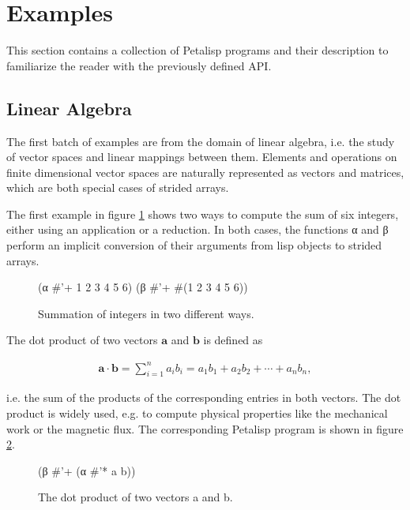 \section{Examples}
\label{sec:examples}

This section contains a collection of Petalisp programs and their
description to familiarize the reader with the previously defined
API.

\subsection{Linear Algebra}

The first batch of examples are from the domain of linear algebra, i.e. the
study of vector spaces and linear mappings between them. Elements and
operations on finite dimensional vector spaces are naturally represented as
vectors and matrices, which are both special cases of strided arrays.

The first example in figure \ref{fig:summation} shows two ways to compute
the sum of six integers, either using an application or a reduction. In
both cases, the functions α and β perform an implicit conversion of their
arguments from lisp objects to strided arrays.

\begin{figure}[h]
\resetlinenumber
\begin{code}
(α #'+ 1 2 3 4 5 6)
(β #'+ #(1 2 3 4 5 6))
\end{code}
\caption{Summation of integers in two different ways.}
\label{fig:summation}
\end{figure}

The dot product of two vectors $\mathbf{a}$ and $\mathbf{b}$ is defined as

\begin{align}
{ \mathbf {a} \cdot \mathbf {b} =\sum _{i=1}^{n}a_{i}b_{i}=a_{1}b_{1}+a_{2}b_{2}+\cdots +a_{n}b_{n}},
\end{align}

i.e. the sum of the products of the corresponding entries in both
vectors. The dot product is widely used, e.g. to compute physical
properties like the mechanical work or the magnetic flux. The corresponding
Petalisp program is shown in figure \ref{fig:dotproduct}.

\begin{figure}[h]
\resetlinenumber
\begin{code}
(β #'+ (α #'* a b))
\end{code}
\caption{The dot product of two vectors a and b.}
\label{fig:dotproduct}
\end{figure}

